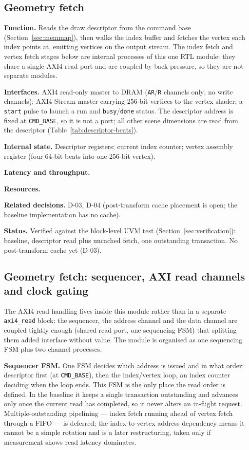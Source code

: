 \documentclass[11pt,a4paper]{article}
\newcommand{\field}[1]{\textbf{#1}\quad}
\begin{document}
\subsection{Geometry fetch}
\field{Function.} Reads the draw descriptor from the command base
(Section~\ref{sec:memmap}), then walks the index buffer and fetches the vertex
each index points at, emitting vertices on the output stream. The index fetch
and vertex fetch stages below are internal processes of this one RTL module:
they share a single AXI4 read port and are coupled by back-pressure, so they
are not separate modules.

\field{Interfaces.} AXI4 read-only master to DRAM (\texttt{AR}/\texttt{R}
channels only; no write channels); AXI4-Stream master carrying 256-bit vertices
to the vertex shader; a \texttt{start} pulse to launch a run and
\texttt{busy}/\texttt{done} status. The descriptor address is fixed at
\texttt{CMD\_BASE}, so it is not a port; all other scene dimensions are read
from the descriptor (Table~\ref{tab:descriptor-beats}).

\field{Internal state.} Descriptor registers; current index counter; vertex
assembly register (four 64-bit beats into one 256-bit vertex).

\field{Latency and throughput.} %

\field{Resources.} %

\field{Related decisions.} D-03, D-04 (post-transform cache placement is open;
the baseline implementation has no cache).

\field{Status.} Verified against the block-level UVM test
(Section~\ref{sec:verification}): baseline, descriptor read plus uncached fetch,
one outstanding transaction. No post-transform cache yet (D-03).

\subsection{Geometry fetch: sequencer, AXI read channels and clock gating}

The AXI4 read handling lives inside this module rather than in a separate
\texttt{axi4\_read} block: the sequencer, the address channel and the data
channel are coupled tightly enough (shared read port, one sequencing FSM) that
splitting them added interface without value. The module is organised as one
sequencing FSM plus two channel processes.

\field{Sequencer FSM.} One FSM decides which address is issued and in what
order: descriptor first (at \texttt{CMD\_BASE}), then the index/vertex loop, an
index counter deciding when the loop ends. This FSM is the only place the read
order is defined. In the baseline it keeps a single transaction outstanding and
advances only once the current read has completed, so it never alters an
in-flight request. Multiple-outstanding pipelining --- index fetch running
ahead of vertex fetch through a FIFO --- is deferred; the index-to-vertex
address dependency means it cannot be a simple rotation and is a later
restructuring, taken only if measurement shows read latency dominates.
\end{document}
